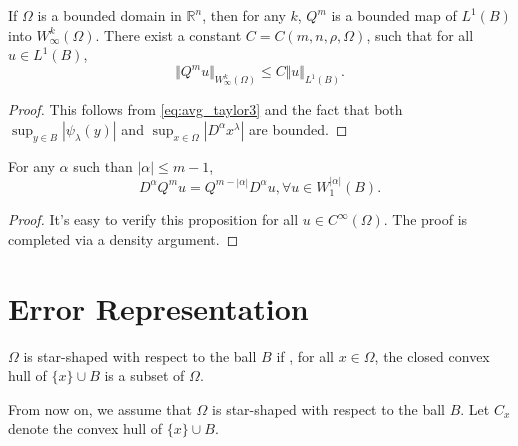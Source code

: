 \documentclass{article}
\begin{document}
\begin{corollary}
    If $\Omega$ is a bounded domain in $\mathbb{R}^n$, then for any $k$, $Q^m$ is a bounded map of $L^1(B)$ into $W^{k}_\infty(\Omega)$.
    There exist a constant $C = C(m,n,\rho,\Omega)$, such that for all $u \in L^1(B)$,
    \begin{equation}
        \Vert Q^m u \Vert_{W^{k}_\infty(\Omega)} \le C \Vert u \Vert_{L^1(B)}.
    \end{equation}
\end{corollary}
\begin{proof}
    This follows from \eqref{eq:avg_taylor3} and the fact that both $\sup_{y \in B} |\psi_\lambda(y)|$ and $\sup_{x \in \Omega} |D^\alpha x^\lambda |$ are bounded.
\end{proof}

\begin{proposition}
    For any $\alpha$ such than $|\alpha| \le m-1$,
    \begin{equation}
        D^\alpha Q^m u = Q^{m - |\alpha|} D^\alpha u, \forall u \in W_1^{|\alpha|}(B).
    \end{equation}
\end{proposition}
\begin{proof}
    It's easy to verify this proposition for all $u \in C^\infty(\Omega)$.
    The proof is completed via a density argument.
\end{proof}

\section{Error Representation}

\begin{definition}
    $\Omega$ is star-shaped with respect to the ball $B$ if , for all $x \in \Omega$, the closed convex hull of $\{x\} \cup B$ is a subset of $\Omega$.
\end{definition}

From now on, we assume that $\Omega$ is star-shaped with respect to the ball $B$. Let $C_x$ denote the convex hull of $\{x\} \cup B$.
\end{document}

